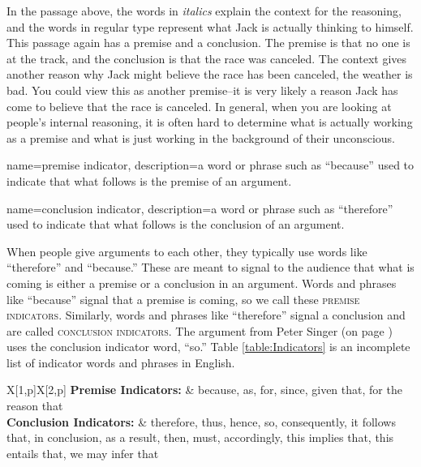 In the passage above, the words in \textit{italics} explain the context for the reasoning, and the words in regular type represent what Jack is actually thinking to himself.  This passage again has a premise and a conclusion. The premise is that no one is at the track, and the conclusion is that the race was canceled. The context gives another reason why Jack might believe the race has been canceled, the weather is bad. You could view this as another premise--it is very likely a reason Jack has come to believe that the race is canceled. In general, when you are looking at people's internal reasoning, it is often hard to determine what is actually working as a premise and what is just working in the background of their unconscious. %


{
name=premise indicator,
description={a word or phrase such as ``because'' used to indicate that what follows is the premise of an argument.}
}

{
name=conclusion indicator,
description={a word or phrase such as ``therefore'' used to indicate that what follows is the conclusion of an argument.}
}

When people give arguments to each other, they typically use words like ``therefore'' and ``because.'' These are meant to signal to the audience that what is coming is either a premise or a conclusion in an argument. Words and phrases like ``because'' signal that a premise is coming, so we call these \textsc{\glspl{premise indicator}}. Similarly, words and phrases like ``therefore'' signal a conclusion and are called \textsc{\glspl{conclusion indicator}}. The argument from Peter Singer (on page \pageref{singer_quote}) uses the conclusion indicator word, ``so.'' Table \ref{table:Indicators} is an incomplete list of indicator words and phrases in English.


\begin{table}
\begin{mdframed}[style=mytablebox]

\begin{longtabu}{X[1,p]X[2,p]}
\textbf{Premise Indicators:} & because, as, for, since, given that, for the reason that \\
\textbf{Conclusion Indicators:} & therefore, thus, hence, so, consequently, it follows that, in conclusion, as a result, then, must, accordingly, this implies that, this entails that, we may infer that \\
\end{longtabu}
\end{mdframed}
\caption{Premise and Conclusion Indicators.}
\label{table:Indicators}
\end{table}

